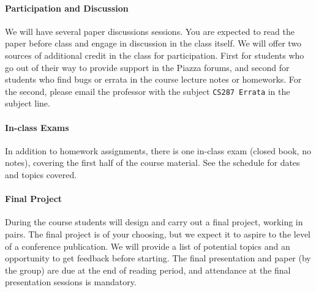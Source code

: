 \documentclass[11pt]{article}
\begin{document}


\paragraph{Participation and Discussion}

We will have several paper discussions sessions. You are expected to
read the paper before class and engage in discussion in the class
itself.  We will offer two sources of additional credit in the class
for participation. First for students who go out of their way to
provide support in the Piazza forums, and second for students who find
bugs or errata in the course lecture notes or homeworks. For the
second, please email the professor with the subject \texttt{CS287
  Errata} in the subject line. 

\paragraph{In-class Exams}

In addition to homework assignments, there is one in-class exam
(closed book, no notes), covering the first half of the course
material. See the schedule for dates and topics covered. 

\paragraph{Final Project}

During the course students will design and carry out a final project,
working in pairs. The final project is of your choosing, but we expect
it to aspire to the level of a conference publication. We will provide
a list of potential topics and an opportunity to get feedback before
starting. The final presentation and paper (by the group)
are due at the end of reading period, and attendance at the final
presentation sessions is mandatory.
\end{document}
